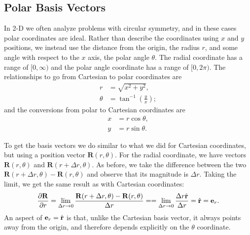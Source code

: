 \subsection{Polar Basis Vectors}

In 2-D we often analyze problems with circular symmetry, and in these cases polar coordinates are ideal. Rather than describe the coordinates using $x$ and $y$ positions, we instead use the distance from the origin, the radius $r$, and some angle with respect to the $x$ axis, the polar angle $\theta$. The radial coordinate has a range of $[0,\infty)$ and the polar angle coordinate has a range of $[0,2\pi)$. The relationships to go from Cartesian to polar coordinates are
\begin{subequations}
\begin{align}
  r &= \sqrt{ x^2 + y^2 }, \\
  \theta &= \tan^{-1} \left( \frac{y}{x} \right) ;
\end{align}
\end{subequations}
and the conversions from polar to Cartesian coordinates are
\begin{subequations}
\begin{align}
  x &= r \cos \theta , \\
  y &= r \sin \theta .
\end{align}
\end{subequations}

To get the basis vectors we do similar to what we did for Cartesian coordinates, but using a position vector $\mathbf{R}(r,\theta)$. For the radial coordinate, we have vectors $\mathbf{R}(r,\theta)$ and $\mathbf{R}(r + \Delta r, \theta)$. As before, we take the difference between the two $\mathbf{R}(r + \Delta r, \theta) - \mathbf{R}(r,\theta)$ and observe that its magnitude is $\Delta r$. Taking the limit, we get the same result as with Cartesian coordinates:
\begin{align}
   \frac{ \partial {\mathbf{R}} }{ \partial {r} } = \lim_{\Delta r \rightarrow 0} \frac{ \mathbf{R}(r + \Delta r, \theta ) - \mathbf{R}(r,\theta) }{ \Delta r } = 
   = \lim_{\Delta r \rightarrow 0} \frac{ \Delta r \hat{\mathbf{r}}}{ \Delta r } = \hat{\mathbf{r}} = \mathbf{e}_r .
\end{align}
An aspect of $\mathbf{e}_r = \hat{\mathbf{r}}$ is that, unlike the Cartesian basis vector, it always points away from the origin, and therefore depends explicitly on the $\theta$ coordinate.

